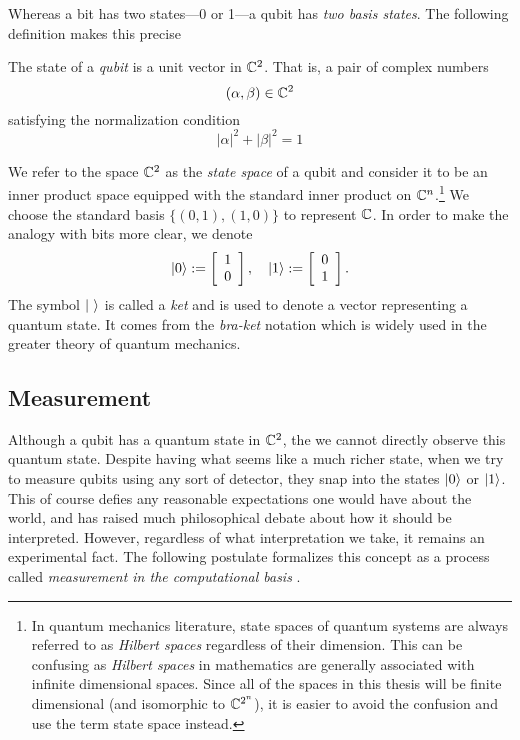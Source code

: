         Whereas a bit has two states---0 or 1---a qubit has \emph{two basis states}. The following definition makes 
        this precise
        \begin{definition}
            The state of a \emph{qubit} is a unit vector in $\mathbb{C}^2$. That is, a pair of complex numbers
            \[
                (\alpha, \beta) \in \mathbb{C}^2
            \]
            satisfying the normalization condition %
            \[
                |\alpha|^2 + |\beta|^2 = 1
            \]
        \end{definition}
        
        We refer to the space $\mathbb{C}^2$ as the \emph{state space} of a qubit and consider it to be an inner product 
        space equipped with the standard inner product on $\mathbb{C}^n$.\footnote{In quantum mechanics literature, state 
            spaces of quantum systems are always referred to as \emph{Hilbert spaces} regardless of their 
            dimension. This can be confusing as \emph{Hilbert spaces} in mathematics are generally associated with 
        infinite dimensional spaces. Since all of the spaces in this thesis will be finite dimensional (and 
    isomorphic to $\mathbb{C}^{2^n}$), it is easier to avoid the confusion and use the term state space instead.}
    We choose the standard basis $\{(0,1), (1,0)\}$ to represent $\mathbb{C}$. In order to make the analogy with bits more 
    clear, we denote \[
            \ket{0} := \left[\begin{array}{r}1\\0\end{array}\right], \quad
            \ket{1} := \left[\begin{array}{r}0\\1\end{array}\right].
         \] The symbol $\ket{\ }$ is called a \emph{ket} and is used to denote a vector representing a quantum 
         state. It comes from the \emph{bra-ket} notation which is widely used in the greater theory of quantum 
         mechanics.
        
        
         \subsection{Measurement} 
         
         Although a qubit has a quantum state in $\mathbb{C}^2$, the we cannot directly observe this quantum state. Despite 
         having what seems like a much richer state, when we try to measure qubits using any sort of detector, they 
         snap into the states $\ket{0}$ or $\ket{1}$. This of course defies any reasonable expectations one would 
         have about the world, and has raised much philosophical debate about how it should be interpreted. 
         However, regardless of what interpretation we take, it remains an experimental fact. The following 
         postulate formalizes this concept as a process called \emph{measurement in the computational basis} .

